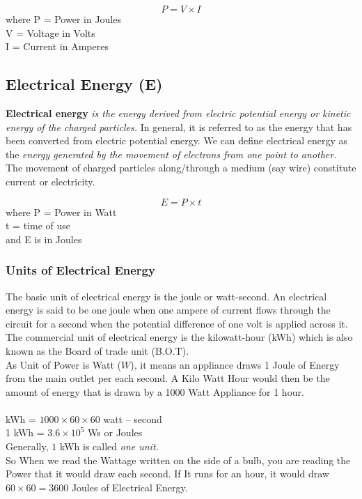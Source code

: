 \documentclass[11pt,a4paper]{article}
\begin{document}
\[P = V  \times I\]
where P = Power in Joules\\
V = Voltage in Volts\\
I = Current in Amperes

\subsection{Electrical Energy (E)}
\textbf{Electrical energy} \textit{is the energy derived from electric potential energy or kinetic energy of the charged particles.} In general, it is referred to as the energy that has been converted from electric potential energy. We can define electrical energy as the\textit{ energy generated by the movement of electrons from one point to another.} The movement of charged particles along/through a medium (say wire) constitute current or electricity.

$$ E = P \times t $$
where P = Power in Watt\\
t = time of use\\
and E is in Joules

\subsubsection{Units of Electrical Energy}

The basic unit of electrical energy is the joule or watt-second. An electrical energy is said to be one joule when one ampere of current flows through the circuit for a second when the potential difference of one volt is applied across it. The commercial unit of electrical energy is the kilowatt-hour (kWh) which is also known as the Board of trade unit (B.O.T).\\

As Unit of Power is Watt ($W$), it means an appliance draws 1 Joule of Energy from the main outlet per each second. A Kilo Watt Hour would then be the amount of energy that is drawn by a 1000 Watt Appliance for 1 hour.\\
\\
 kWh = $ 1000 \times 60 \times 60 $ watt – second\\ 
1 kWh = $ 3.6 \times 10^5 $ Ws or Joules\\
Generally, $ 1 $ kWh is called \textit{one unit.}\\

So When we read the Wattage written on the side of a bulb, you are reading the Power that it would draw each second. If It runs for an hour, it would draw $ 60 \times 60 = 3600 $ Joules of Electrical Energy.
\end{document}
